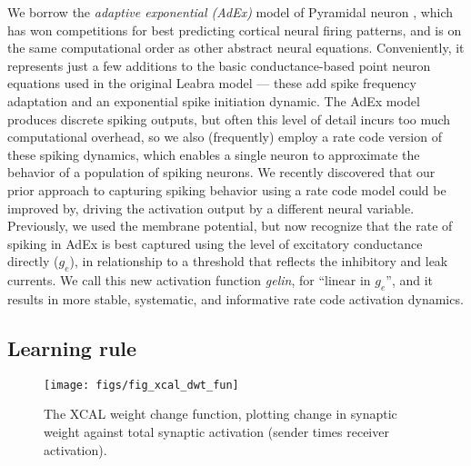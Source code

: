 \documentclass[11pt,twoside]{article}
\begin{document}
We borrow the {\em adaptive exponential (AdEx)} model of Pyramidal
neuron \cite{Gerstner}, which has won competitions for best predicting
cortical neural firing patterns, and is on the same computational
order as other abstract neural equations.  Conveniently, it represents
just a few additions to the basic conductance-based point neuron
equations used in the original Leabra model --- these add spike
frequency adaptation and an exponential spike initiation dynamic.  The
AdEx model produces discrete spiking outputs, but often this level of
detail incurs too much computational overhead, so we also (frequently)
employ a rate code version of these spiking dynamics, which enables a
single neuron to approximate the behavior of a population of spiking
neurons.  We recently discovered that our prior approach to capturing
spiking behavior using a rate code model could be improved by, driving
the activation output by a different neural variable.  Previously, we
used the membrane potential, but now recognize that the rate of
spiking in AdEx is best captured using the level of excitatory
conductance directly ($g_e$), in relationship to a threshold that
reflects the inhibitory and leak currents.  We call this new
activation function {\em gelin}, for ``linear in $g_e$'', and it
results in more stable, systematic, and informative rate code
 activation dynamics.

\subsection{Learning rule}

\begin{figure}
  \centering\texttt{[image: figs/fig\_xcal\_dwt\_fun]}
  \caption{\small The XCAL weight change function, plotting change in
 synaptic weight against total synaptic activation (sender times
 receiver activation).}
  \label{fig.xcal_fun}
\end{figure}
\end{document}
